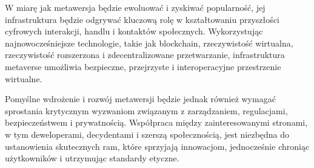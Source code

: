 W miarę jak metawersja będzie ewoluować i zyskiwać popularność, jej infrastruktura będzie odgrywać kluczową rolę w kształtowaniu przyszłości cyfrowych interakcji, handlu i kontaktów społecznych. Wykorzystując najnowocześniejsze technologie, takie jak blockchain, rzeczywistość wirtualna, rzeczywistość rozszerzona i zdecentralizowane przetwarzanie, infrastruktura metaverse umożliwia bezpieczne, przejrzyste i interoperacyjne przestrzenie wirtualne.

Pomyślne wdrożenie i rozwój metawersji będzie jednak również wymagać sprostania krytycznym wyzwaniom związanym z zarządzaniem, regulacjami, bezpieczeństwem i prywatnością. Współpraca między zainteresowanymi stronami, w tym deweloperami, decydentami i szerszą społecznością, jest niezbędna do ustanowienia skutecznych ram, które sprzyjają innowacjom, jednocześnie chroniąc użytkowników i utrzymując standardy etyczne.
